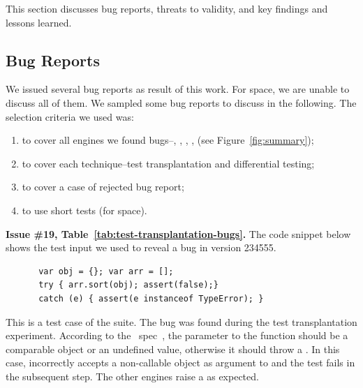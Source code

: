 \documentclass[smallextended]{svjour3}
\begin{document}
This section discusses bug reports, threats to validity, and key
findings and lessons learned.

\subsection{Bug Reports}

We issued several bug reports as result of this work. For space, we
are unable to discuss all of them. We sampled some bug reports to
discuss in the following. The selection criteria we used was:
\begin{enumerate}
\item to cover all engines we found bugs--\chakra, \hermes, \jsc,
  \smonkey, \veight (see Figure~\ref{fig:summary});
\item to cover each technique--test transplantation and differential
  testing;
\item to cover a case of rejected bug report;
\item to use short tests (for space).
\end{enumerate}


\sloppy

\vspace{1ex}\noindent\textbf{Issue \#19,
  Table~\ref{tab:test-transplantation-bugs}.} The code snippet below
shows the test input we used to reveal a bug in \textbf{\jsc} version 234555.

\begin{figure}[h!]
  \vspace{-0.5ex}
  \centering
  \scriptsize
  \begin{lstlisting}
 var obj = {}; var arr = [];
 try { arr.sort(obj); assert(false);}
 catch (e) { assert(e instanceof TypeError); }
  \end{lstlisting}
  \normalsize
  \vspace{-1ex}
\end{figure}

This is a test case of the \jerry{} suite. The bug was found during
the test transplantation experiment. According to the
\es\ spec~\cite{ecmas262-array-sort}, the parameter to the
 function should be a comparable object or an
undefined value, otherwise it should throw a . In
this case, \jsc incorrectly accepts a non-callable object as argument
to  and the test fails in the subsequent step. The other
engines raise a  as expected.
\end{document}
